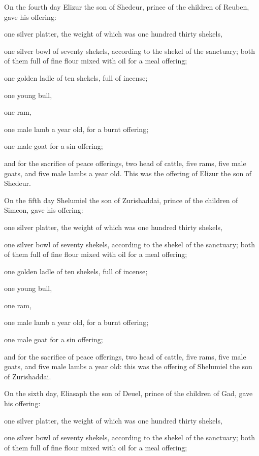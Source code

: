 {\par }{\PP {}On the fourth day Elizur the son of Shedeur, prince of the children of Reuben,
gave his offering:
\par }{\PP one silver platter, the weight of which was one hundred thirty shekels,
\par }{\PP one silver bowl of seventy shekels, according to the shekel of the sanctuary; both of them full of fine flour mixed with oil for a meal offering;
\par }{\PP {}one golden ladle of ten shekels, full of incense;
\par }{\PP {}one young bull,
\par }{\PP one ram,
\par }{\PP one male lamb a year old, for a burnt offering;
\par }{\PP {}one male goat for a sin offering;
\par }{\PP {}and for the sacrifice of peace offerings, two head of cattle, five rams, five male goats, and five male lambs a year old. This was the offering of Elizur the son of Shedeur.
\par }{\PP {}On the fifth day Shelumiel the son of Zurishaddai, prince of the children of Simeon,
gave his offering:
\par }{\PP one silver platter, the weight of which was one hundred thirty shekels,
\par }{\PP one silver bowl of seventy shekels, according to the shekel of the sanctuary; both of them full of fine flour mixed with oil for a meal offering;
\par }{\PP {}one golden ladle of ten shekels, full of incense;
\par }{\PP {}one young bull,
\par }{\PP one ram,
\par }{\PP one male lamb a year old, for a burnt offering;
\par }{\PP {}one male goat for a sin offering;
\par }{\PP {}and for the sacrifice of peace offerings, two head of cattle, five rams, five male goats, and five male lambs a year old: this was the offering of Shelumiel the son of Zurishaddai.
\par }{\PP {}On the sixth day, Eliasaph the son of Deuel, prince of the children of Gad,
gave his offering:
\par }{\PP one silver platter, the weight of which was one hundred thirty shekels,
\par }{\PP one silver bowl of seventy shekels, according to the shekel of the sanctuary; both of them full of fine flour mixed with oil for a meal offering;
}
